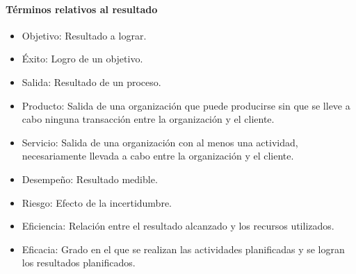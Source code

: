 					\paragraph{Términos relativos al resultado}
					\begin{itemize}
						\item Objetivo: Resultado a lograr.
						
						\item Éxito: Logro de un objetivo.
						
						\item Salida: Resultado de un proceso.
						
						\item Producto: Salida de una organización que puede producirse sin que se lleve a cabo ninguna transacción entre la organización y el cliente.
						
						\item Servicio: Salida de una organización con al menos una actividad, necesariamente llevada a cabo
						entre la organización y el cliente.
						
						\item Desempeño: Resultado medible.
						
						\item Riesgo: Efecto de la incertidumbre.
						
						\item Eficiencia: Relación entre el resultado alcanzado y los recursos utilizados.
						
						\item Eficacia: Grado en el que se realizan las actividades planificadas y se logran los resultados planificados.
					\end{itemize}
				
